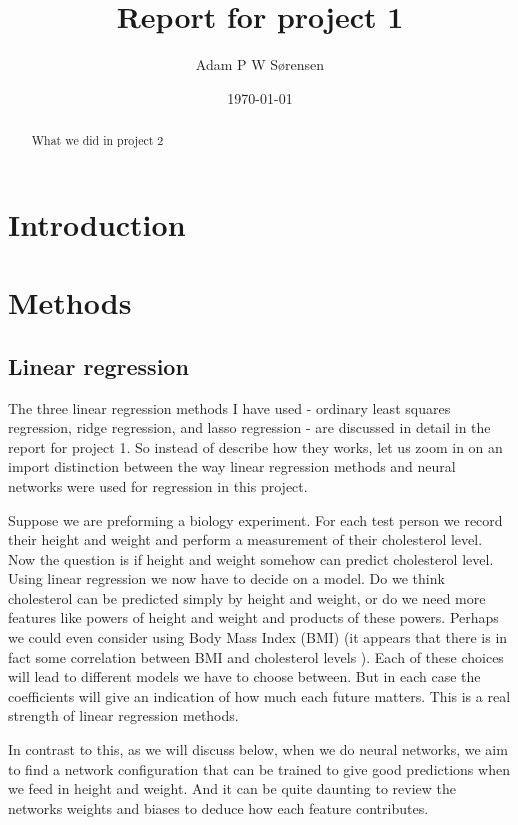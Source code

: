 \documentclass[parskip=half]{scrartcl}
\title{Report for project 1}
\date{\today}
\author{Adam P W S{\o}rensen}
\theoremstyle{definition}
\theoremstyle{remark}
\begin{document}

\maketitle

\begin{abstract}
What we did in project 2
\end{abstract}


\section{Introduction}


\section{Methods} \label{sec:methods}
 
\subsection{Linear regression} \label{sec:linear} 

The three linear regression methods I have used - ordinary least squares regression, ridge regression, and lasso regression - are discussed in detail in the report for project 1. 
So instead of describe how they works, let us zoom in on an import distinction between the way linear regression methods and neural networks were used for regression in this project.  

Suppose we are preforming a biology experiment.
For each test person we record their height and weight and perform a measurement of their cholesterol level. 
Now the question is if height and weight somehow can predict cholesterol level. 
Using linear regression we now have to decide on a model.
Do we think cholesterol can be predicted simply by height and weight, or do we need more features like powers of height and weight and products of these powers. 
Perhaps we could even consider using Body Mass Index (BMI) (it appears that there is in fact some correlation between BMI and cholesterol levels \cite{somepaper}).
Each of these choices will lead to different models we have to choose between.
But in each case the coefficients will give an indication of how much each future matters.
This is a real strength of linear regression methods. 

In contrast to this, as we will discuss below, when we do neural networks, we aim to find a network configuration that can be trained to give good predictions when we feed in height and weight. 
And it can be quite daunting to review the networks weights and biases to deduce how each feature contributes.     
\end{document}
